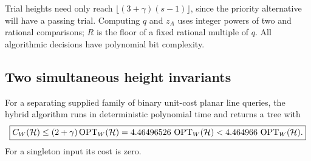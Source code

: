 Trial heights need only reach $\lfloor(3+\gamma)(s-1)\rfloor$,
since the priority alternative will have a passing trial. Computing
$q$ and $z_A$ uses integer powers of two and rational comparisons;
$R$ is the floor of a fixed rational multiple of $q$.
All algorithmic decisions have polynomial bit complexity.





\subsection{Two simultaneous height invariants}

\begin{theorem}
\label{thm:poly-slot-worst}
For a separating supplied family of binary unit-cost planar line
queries, the hybrid algorithm runs in deterministic polynomial time
and returns a tree with
\[
 \boxed{C_W(\mathcal H)\le(2+\gamma)\operatorname{OPT}_W(\mathcal H)
       =4.46496526\,\operatorname{OPT}_W(\mathcal H)<4.464966\,\operatorname{OPT}_W(\mathcal H).}
\]
For a singleton input its cost is zero.
\end{theorem}
